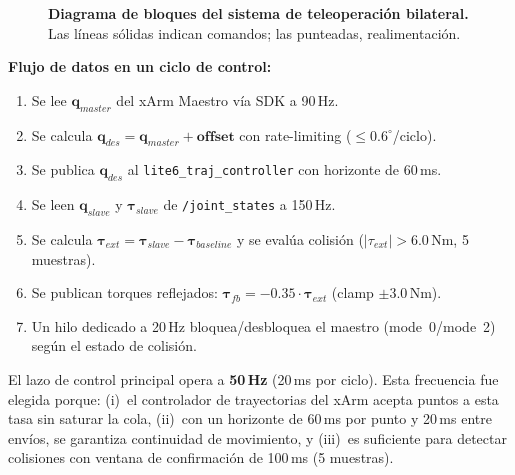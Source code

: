\documentclass[journal,10pt,twoside]{IEEEtran}
\begin{document}
\begin{figure}[H]
{
}
\caption{\textbf{Diagrama de bloques del sistema de teleoperación bilateral.}
Las líneas sólidas indican comandos; las punteadas, realimentación.}
\label{fig:architecture}
\end{figure}

\textbf{Flujo de datos en un ciclo de control:}
\begin{enumerate}
  \item Se lee $\bm{q}_{master}$ del xArm Maestro vía SDK a 90\,Hz.
  \item Se calcula $\bm{q}_{des}=\bm{q}_{master}+\bm{offset}$ con
        rate-limiting ($\leq 0{.}6^\circ$/ciclo).
  \item Se publica $\bm{q}_{des}$ al \texttt{lite6\_traj\_controller}
        con horizonte de 60\,ms.
  \item Se leen $\bm{q}_{slave}$ y $\bm{\tau}_{slave}$ de \texttt{/joint\_states}
        a 150\,Hz.
  \item Se calcula $\bm{\tau}_{ext}=\bm{\tau}_{slave}-\bm{\tau}_{baseline}$
        y se evalúa colisión ($|\tau_{ext}|>6{.}0$\,Nm, 5 muestras).
  \item Se publican torques reflejados:
        $\bm{\tau}_{fb}=-0{.}35\cdot\bm{\tau}_{ext}$ (clamp $\pm3{.}0$\,Nm).
  \item Un hilo dedicado a 20\,Hz bloquea/desbloquea el maestro
        (mode~0/mode~2) según el estado de colisión.
\end{enumerate}

El lazo de control principal opera a \textbf{50\,Hz} (20\,ms
por ciclo). Esta frecuencia fue elegida porque: (i)~el controlador de
trayectorias del xArm acepta puntos a esta tasa sin saturar la cola,
(ii)~con un horizonte de 60\,ms por punto y 20\,ms entre envíos, se
garantiza continuidad de movimiento, y (iii)~es suficiente para detectar
colisiones con ventana de confirmación de 100\,ms (5 muestras).
\end{document}
